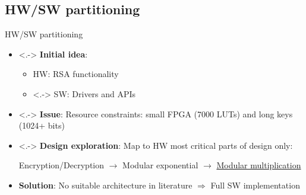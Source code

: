 \documentclass[aspectratio=169]{beamer}
\begin{document}
\subsection{HW/SW partitioning}
\begin{frame}{HW/SW partitioning}
	\begin{itemize}[<+->]
		\item<.-> \textbf{Initial idea}:
			\begin{itemize}
				\item HW: RSA functionality
				\item<.-> SW: Drivers and APIs
			\end{itemize}
		\item<.-> \textbf{Issue}: Resource constraints: small FPGA
			(7000 LUTs) and long keys (1024+ bits)
		\item<.-> \textbf{Design exploration}:
			Map to HW most critical parts of design only:
			
			Encryption/Decryption $\rightarrow$ Modular exponential
			$\rightarrow$ \ul{Modular multiplication}
		\item \textbf{Solution}:
			No suitable architecture in literature $\Rightarrow$
			Full SW implementation
	\end{itemize}
\end{frame}
\end{document}
